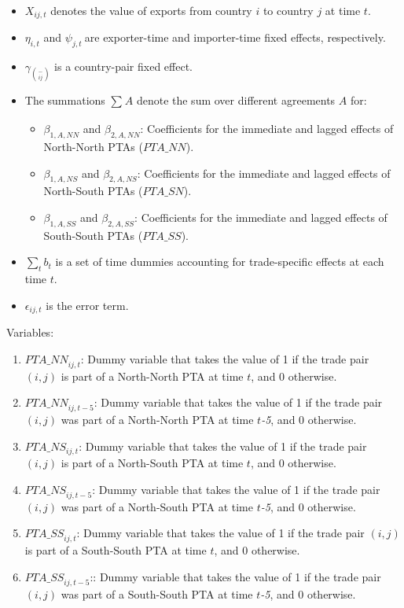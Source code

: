 \documentclass{article}%
\begin{document}
\begin{itemize}
\item
  \(X_{ij,t}\)\hspace{0pt} denotes the value of exports from country
  \(i\) to country \(j\) at time \(t\).
\item
  \(\eta_{i,t}\) and \(\psi_{j,t}\ \)are exporter-time and importer-time
  fixed effects, respectively.
\item
  \(\gamma_{\binom{-}{ij}}\) is a country-pair fixed effect.
\item
  The summations \hspace{0pt}\(\sum_{}^{}A\) denote the sum over
  different agreements \(A\) for:

  \begin{itemize}
  \item
    \(\beta_{1,A,NN}\) and \(\beta_{2,A,NN}\): Coefficients for the
    immediate and lagged effects of North-North PTAs
    \hspace{0pt}(\(PTA\_ NN\)).
  \item
    \(\beta_{1,A,NS}\) and \(\beta_{2,A,NS}\): Coefficients for the
    immediate and lagged effects of North-South PTAs (\(PTA\_ SN\)).
  \item
    \(\beta_{1,A,SS}\) and \(\beta_{2,A,SS}\): Coefficients for the
    immediate and lagged effects of South-South PTAs (\(PTA\_ SS\)).
  \end{itemize}
\item
  \(\sum_{t}^{}b_{t}\) is a set of time dummies accounting for
  trade-specific effects at each time \(t\).
\item
  \(\epsilon_{ij,t}\) is the error term.
\end{itemize}

Variables:

\begin{enumerate}
\def\labelenumi{\arabic{enumi}.}
\item
  \({PTA\_ NN}_{ij,t}\): Dummy variable that takes the value of 1 if the
  trade pair \((i,j)\) is part of a North-North PTA at time \(t\), and 0
  otherwise.
\item
  \({PTA\_ NN}_{ij,t - 5}\): Dummy variable that takes the value of 1 if
  the trade pair \((i,j)\) was part of a North-North PTA at time
  \(t\)\emph{-5}, and 0 otherwise.
\item
  \({PTA\_ NS}_{ij,t}\): Dummy variable that takes the value of 1 if the
  trade pair \((i,j)\) is part of a North-South PTA at time \(t\), and 0
  otherwise.
\item
  \({PTA\_ NS}_{ij,t - 5}\): Dummy variable that takes the value of 1 if
  the trade pair \((i,j)\) was part of a North-South PTA at time
  \(t\)\emph{-5}, and 0 otherwise.
\item
  \({PTA\_ SS}_{ij,t}\): Dummy variable that takes the value of 1 if the
  trade pair \((i,j)\) is part of a South-South PTA at time \(t\), and 0
  otherwise.
\item
  \({PTA\_ SS}_{ij,t - 5}\):: Dummy variable that takes the value of 1
  if the trade pair \((i,j)\) was part of a South-South PTA at time
  \(t\)\emph{-5}, and 0 otherwise.
\end{enumerate}
\end{document}
